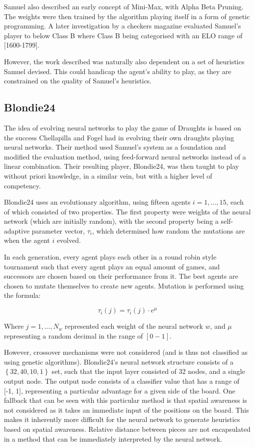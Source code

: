 \documentclass[12pt,a4paper]{article}
\begin{document}
        Samuel also described an early concept of Mini-Max, with Alpha Beta Pruning. The weights were then trained by the algorithm playing itself in a form of genetic programming. A later investigation by a checkers magazine evaluated Samuel's player to below Class B \cite{schaeffer_one_1997,fogel_evolving_2000} where Class B being categorised with an ELO range of [1600-1799]. 

        However, the work described was naturally also dependent on a set of heuristics Samuel devised. This could handicap the agent's ability to play, as they are constrained on the quality of Samuel's heuristics. 

    \subsection{Blondie24}
        The idea of evolving neural networks to play the game of Draughts is based on the success Chellapilla and Fogel had in evolving their own draughts playing neural networks. Their method used Samuel's system as a foundation and modified the evaluation method, using feed-forward neural networks instead of a linear combination. Their resulting player, Blondie24, was then taught to play without priori knowledge, in a similar vein, but with a higher level of competency. \cite{chellapilla_evolving_1999}

        Blondie24 uses an evolutionary algorithm, using fifteen agents $i=1,\dots,15$, each of which consisted of two properties. The first property were weights of the neural network (which are initially random), with the second property being a self-adaptive parameter vector, $\tau_i$, which determined how random the mutations are when the agent $i$ evolved.
        
        In each generation, every agent plays each other in a round robin style tournament such that every agent plays an equal amount of games, and successors are chosen based on their performance from it. The best agents are chosen to mutate themselves to create new agents. Mutation is performed using the formula:

        $$
        \tau_i(j) = \tau_i(j) \cdot e^{\mu}
        $$
        
        Where $j=1,...,N_w$ represented each weight of the neural network $w$, and $\mu$ representing a random decimal in the range of $[0-1]$. 

        However, crossover mechanisms were not considered (and is thus not classified as using genetic algorithms). Blondie24's neural network structure consists of a $\left\{ 32,40,10,1 \right\}$ set, such that the input layer consisted of 32 nodes, and a single output node. The output node consists of a classifier value that has a range of [-1, 1], representing a particular advantage for a given side of the board. One fallback that can be seen with this particular method is that spatial awareness is not considered as it takes an immediate input of the positions on the board. This makes it inherently more difficult for the neural network to generate heuristics based on spatial awareness. Relative distance between pieces are not encapsulated in a method that can be immediately interpreted by the neural network.
\end{document}
